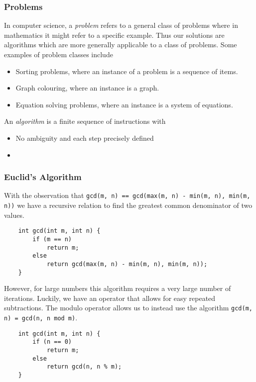 \documentclass[12pt]{report}
\newcommand{\code}[1]{\lstinline{#1}}
\begin{document}
\begin{flushleft}

\subsubsection*{Problems}

In computer science, a \textit{problem} refers to a general class of problems
where in mathematics it might refer to a specific example. Thus our solutions
are algorithms which are more generally applicable to a class of problems. Some
examples of problem classes include

\begin{itemize}
    \item Sorting problems, where an instance of a problem is a sequence of
        items.
    \item Graph colouring, where an instance is a graph.
    \item Equation solving problems, where an instance is a system of equations.
\end{itemize}

An \textit{algorithm} is a finite sequence of instructions with

\begin{itemize}
    \item No ambiguity and each step precisely defined
    \item 
\end{itemize}

\subsubsection*{Euclid's Algorithm}

With the observation that \code{gcd(m, n) == gcd(max(m, n) -
min(m, n), min(m, n))} we have a recursive
relation to find the greatest common denominator of two values.

\begin{lstlisting}
    int gcd(int m, int n) {
        if (m == n)
            return m;
        else
            return gcd(max(m, n) - min(m, n), min(m, n));
    }
\end{lstlisting}

However, for large numbers this algorithm requires a very large number of
iterations. Luckily, we have an operator that allows for easy repeated
subtractions. The modulo operator allows us to instead use the algorithm
\code{gcd(m, n) = gcd(n, n mod m)}.

\begin{lstlisting}
    int gcd(int m, int n) {
        if (n == 0)
            return m;
        else
            return gcd(n, n % m);
    }
\end{lstlisting}


\end{flushleft}
\end{document}
